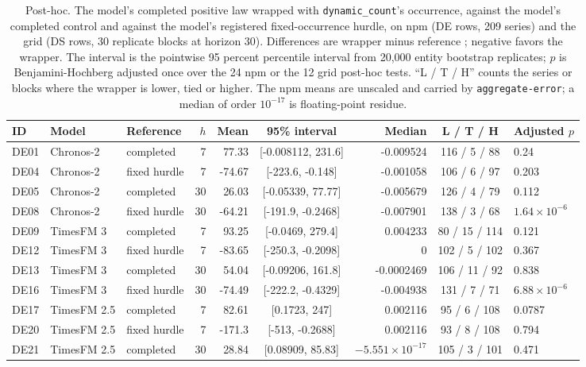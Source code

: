 \begin{table}[htbp]
\centering\footnotesize\setlength{\tabcolsep}{3.5pt}
\caption{Post-hoc. The model's completed positive law wrapped with \texttt{dynamic\_count}'s occurrence,
against the model's completed control and against the model's registered fixed-occurrence hurdle, on npm
(DE rows, 209 series) and the grid (DS rows, 30 replicate blocks at horizon 30). Differences are wrapper
minus reference \qs{}; negative favors the wrapper. The interval is the pointwise 95 percent percentile
interval from 20,000 entity bootstrap replicates; $p$ is Benjamini-Hochberg adjusted once over the 24 npm or
the 12 grid post-hoc tests. ``L / T / H'' counts the series or blocks where the wrapper is lower, tied or
higher. The npm means are unscaled and carried by \texttt{aggregate-error}; a median of order $10^{-17}$ is
floating-point residue.}
\label{tab:s2dyn}
\begin{tabular}{lllrrcrcl}
\toprule
ID & Model & Reference & $h$ & Mean & 95\% interval & Median & L / T / H & Adjusted $p$ \\
\midrule
DE01 & Chronos-2 & completed & 7 & 77.33 & [-0.008112, 231.6] & -0.009524 & 116 / 5 / 88 & 0.24 \\
DE04 & Chronos-2 & fixed hurdle & 7 & -74.67 & [-223.6, -0.148] & -0.001058 & 106 / 6 / 97 & 0.203 \\
DE05 & Chronos-2 & completed & 30 & 26.03 & [-0.05339, 77.77] & -0.005679 & 126 / 4 / 79 & 0.112 \\
DE08 & Chronos-2 & fixed hurdle & 30 & -64.21 & [-191.9, -0.2468] & -0.007901 & 138 / 3 / 68 & $1.64 \times 10^{-6}$ \\
DE09 & TimesFM 3 & completed & 7 & 93.25 & [-0.0469, 279.4] & 0.004233 & 80 / 15 / 114 & 0.121 \\
DE12 & TimesFM 3 & fixed hurdle & 7 & -83.65 & [-250.3, -0.2098] & 0 & 102 / 5 / 102 & 0.367 \\
DE13 & TimesFM 3 & completed & 30 & 54.04 & [-0.09206, 161.8] & -0.0002469 & 106 / 11 / 92 & 0.838 \\
DE16 & TimesFM 3 & fixed hurdle & 30 & -74.49 & [-222.2, -0.4329] & -0.004938 & 131 / 7 / 71 & $6.88 \times 10^{-6}$ \\
DE17 & TimesFM 2.5 & completed & 7 & 82.61 & [0.1723, 247] & 0.002116 & 95 / 6 / 108 & 0.0787 \\
DE20 & TimesFM 2.5 & fixed hurdle & 7 & -171.3 & [-513, -0.2688] & 0.002116 & 93 / 8 / 108 & 0.794 \\
DE21 & TimesFM 2.5 & completed & 30 & 28.84 & [0.08909, 85.83] & $-5.551 \times 10^{-17}$ & 105 / 3 / 101 & 0.471 \\

\end{tabular}
\end{table}
